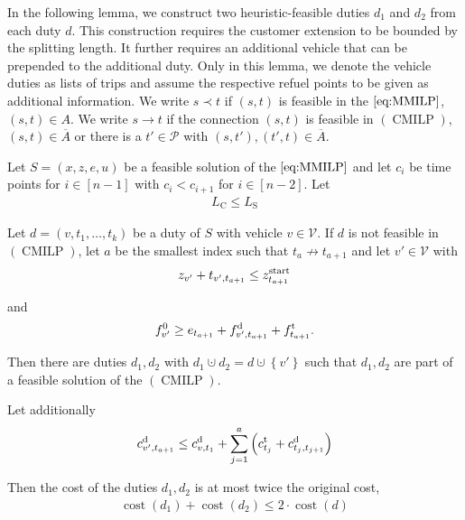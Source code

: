 In the following lemma, we construct two heuristic-feasible duties $d_1$ and $d_2$ from each duty $d$. This construction requires the customer extension to be bounded by the splitting length. It further requires an additional vehicle that can be prepended to the additional duty. Only in this lemma, we denote the vehicle duties as lists of trips and assume the respective refuel points to be given as additional information. We write ${s\prec t}$ if $(s,t)$ is feasible in the $\eqref{eq:MMILP}$, \ie ${(s,t)\in A}$.  We write ${s\to t}$ if the connection $(s,t)$ is feasible in $(\operatorname{CMILP})$, \ie ${(s,t)\in\overline{A}}$ or there is a ${t'\in\mathcal{P}}$ with ${(s,t'),(t',t)\in\overline{A}}$.

\begin{lemma}
\label{lem:doubleduties}

Let $S=\left(x,z,e,u\right)$ be a feasible solution of the $\eqref{eq:MMILP}$ and let $c_i$ be time points for $i\in[n-1]$ with ${c_i<c_{i+1}}$ for ${i\in[n-2]}$. Let
\begin{align}
	L_{\operatorname{C}}\leq L_{\operatorname{S}}\label{eq:LCLS}
\end{align}

Let ${d=\left(v,t_1,\dots,t_k\right)}$ be a duty of $S$ with vehicle $v\in\mathcal{V}$. If $d$ is not feasible in $(\operatorname{CMILP})$, let $a$ be the smallest index such that ${t_a\not\to t_{a+1}}$ and let ${v'\in\mathcal{V}}$ with
\begin{align}
	z_{v'} + t_{v',t_{a+1}}\leq z^{\operatorname{start}}_{t_{a+1}}\label{eq:doubleduties:time}
\end{align}

and
\begin{align}
	f^0_{v'}\geq e_{t_{a+1}} + f^{\operatorname{d}}_{v',t_{a+1}} + f^{\operatorname{t}}_{t_{a+1}}.\label{eq:doubleduties:fuel}
\end{align}

Then there are duties $d_1,d_2$ with ${d_1\cupdot d_2=d\cupdot\left\{v'\right\}}$ such that $d_1,d_2$ are part of a feasible solution of the $(\operatorname{CMILP})$.

Let additionally
\begin{align}
	c^{\operatorname{d}}_{v',t_{a+1}}\leq c^{\operatorname{d}}_{v,t_1} + \sum_{j=1}^a \left(c^{\operatorname{t}}_{t_j} + c^{\operatorname{d}}_{t_j,t_{j+1}}\right) \label{eq:doubleduties:cost}
\end{align}

Then the cost of the duties $d_1,d_2$ is at most twice the original cost, \ie
\begin{align*}
	\operatorname{cost}\left(d_1\right) + \operatorname{cost}\left(d_2\right) \leq 2\cdot\operatorname{cost}\left(d\right)
\end{align*}

\end{lemma}

